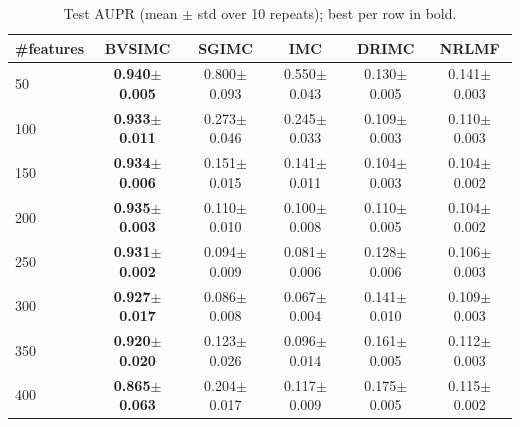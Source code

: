 \begin{table}[t]
\centering
\caption{Test AUPR (mean $\pm$ std over 10 repeats); best per row in bold.}
\label{tab:aupr}
\begin{tabular}{lccccc}
\toprule
\#features & BVSIMC & SGIMC & IMC & DRIMC & NRLMF \\
\midrule
50 & \textbf{0.940$\pm$0.005} & 0.800$\pm$0.093 & 0.550$\pm$0.043 & 0.130$\pm$0.005 & 0.141$\pm$0.003 \\
100 & \textbf{0.933$\pm$0.011} & 0.273$\pm$0.046 & 0.245$\pm$0.033 & 0.109$\pm$0.003 & 0.110$\pm$0.003 \\
150 & \textbf{0.934$\pm$0.006} & 0.151$\pm$0.015 & 0.141$\pm$0.011 & 0.104$\pm$0.003 & 0.104$\pm$0.002 \\
200 & \textbf{0.935$\pm$0.003} & 0.110$\pm$0.010 & 0.100$\pm$0.008 & 0.110$\pm$0.005 & 0.104$\pm$0.002 \\
250 & \textbf{0.931$\pm$0.002} & 0.094$\pm$0.009 & 0.081$\pm$0.006 & 0.128$\pm$0.006 & 0.106$\pm$0.003 \\
300 & \textbf{0.927$\pm$0.017} & 0.086$\pm$0.008 & 0.067$\pm$0.004 & 0.141$\pm$0.010 & 0.109$\pm$0.003 \\
350 & \textbf{0.920$\pm$0.020} & 0.123$\pm$0.026 & 0.096$\pm$0.014 & 0.161$\pm$0.005 & 0.112$\pm$0.003 \\
400 & \textbf{0.865$\pm$0.063} & 0.204$\pm$0.017 & 0.117$\pm$0.009 & 0.175$\pm$0.005 & 0.115$\pm$0.002 \\
\bottomrule
\end{tabular}
\end{table}
